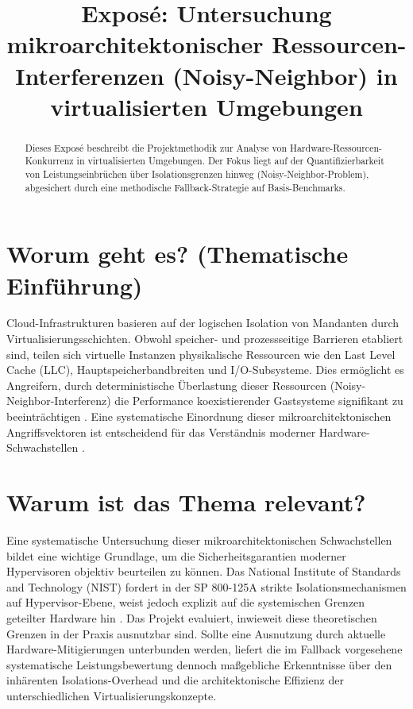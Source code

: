 \documentclass[conference]{IEEEtran}
\begin{document}
\title{Exposé: Untersuchung mikroarchitektonischer Ressourcen-Interferenzen (Noisy-Neighbor) in virtualisierten Umgebungen}

\author{
}

\maketitle

\begin{abstract}
Dieses Exposé beschreibt die Projektmethodik zur Analyse von Hardware-Ressourcen-Konkurrenz in virtualisierten Umgebungen. Der Fokus liegt auf der Quantifizierbarkeit von Leistungseinbrüchen über Isolationsgrenzen hinweg (Noisy-Neighbor-Problem), abgesichert durch eine methodische Fallback-Strategie auf Basis-Benchmarks.
\end{abstract}

\section{Worum geht es? (Thematische Einführung)}
Cloud-Infrastrukturen basieren auf der logischen Isolation von Mandanten durch Virtualisierungsschichten. Obwohl speicher- und prozessseitige Barrieren etabliert sind, teilen sich virtuelle Instanzen physikalische Ressourcen wie den Last Level Cache (LLC), Hauptspeicherbandbreiten und I/O-Subsysteme. Dies ermöglicht es Angreifern, durch deterministische Überlastung dieser Ressourcen (Noisy-Neighbor-Interferenz) die Performance koexistierender Gastsysteme signifikant zu beeinträchtigen \cite{koh2007analysis}. Eine systematische Einordnung dieser mikroarchitektonischen Angriffsvektoren ist entscheidend für das Verständnis moderner Hardware-Schwachstellen \cite{ge2018survey}.

\section{Warum ist das Thema relevant?}
Eine systematische Untersuchung dieser mikroarchitektonischen Schwachstellen bildet eine wichtige Grundlage, um die Sicherheitsgarantien moderner Hypervisoren objektiv beurteilen zu können. Das National Institute of Standards and Technology (NIST) fordert in der SP 800-125A strikte Isolationsmechanismen auf Hypervisor-Ebene, weist jedoch explizit auf die systemischen Grenzen geteilter Hardware hin \cite{nist2014hypervisor}. Das Projekt evaluiert, inwieweit diese theoretischen Grenzen in der Praxis ausnutzbar sind. Sollte eine Ausnutzung durch aktuelle Hardware-Mitigierungen unterbunden werden, liefert die im Fallback vorgesehene systematische Leistungsbewertung dennoch maßgebliche Erkenntnisse über den inhärenten Isolations-Overhead und die architektonische Effizienz der unterschiedlichen Virtualisierungskonzepte.
\end{document}
